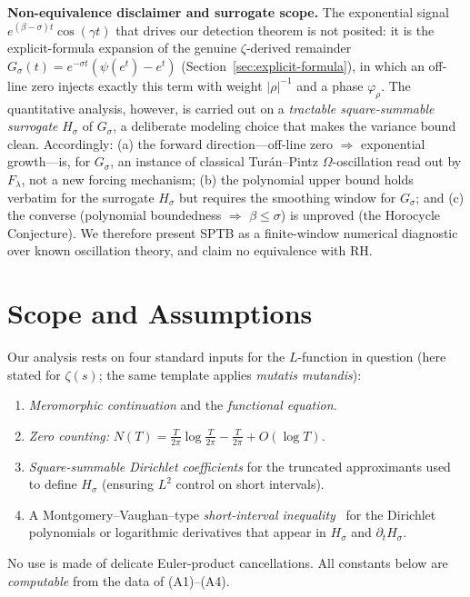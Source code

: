 \medskip
\noindent\textbf{Non-equivalence disclaimer and surrogate scope.}
The exponential signal $e^{(\beta-\sigma)t}\cos(\gamma t)$ that drives our
detection theorem is not posited: it is the explicit-formula expansion of the
genuine $\zeta$-derived remainder $G_\sigma(t)=e^{-\sigma t}(\psi(e^t)-e^t)$
(Section~\ref{sec:explicit-formula}), in which an off-line zero injects exactly
this term with weight $|\rho|^{-1}$ and a phase $\varphi_\rho$. The quantitative
analysis, however, is carried out on a \emph{tractable square-summable surrogate}
$H_\sigma$ of $G_\sigma$, a deliberate modeling choice that makes the variance
bound clean. Accordingly: (a) the forward direction---off-line zero
$\Rightarrow$ exponential growth---is, for $G_\sigma$, an instance of classical
Tur\'an--Pintz $\Omega$-oscillation read out by $F_\lambda$, not a new forcing
mechanism; (b) the polynomial upper bound holds verbatim for the surrogate
$H_\sigma$ but requires the smoothing window for $G_\sigma$; and (c) the
converse (polynomial boundedness $\Rightarrow$ $\beta\le\sigma$) is unproved (the
Horocycle Conjecture). We therefore present SPTB as a finite-window numerical
diagnostic over known oscillation theory, and claim no equivalence with RH.

\section{Scope and Assumptions}

Our analysis rests on four standard inputs for the $L$-function in question
(here stated for $\zeta(s)$; the same template applies \emph{mutatis mutandis}):

\begin{enumerate}
\item[(A1)] \emph{Meromorphic continuation} and the \emph{functional equation.}
\item[(A2)] \emph{Zero counting:}
$N(T)=\tfrac{T}{2\pi}\log\tfrac{T}{2\pi}-\tfrac{T}{2\pi}+O(\log T)$.
\item[(A3)] \emph{Square-summable Dirichlet coefficients} for the truncated
approximants used to define $H_\sigma$ (ensuring $L^2$ control on short intervals).
\item[(A4)] A Montgomery–Vaughan–type \emph{short-interval inequality}~\cite{montgomery-vaughan}
for the Dirichlet
polynomials or logarithmic derivatives that appear in $H_\sigma$ and $\partial_t H_\sigma$.
\end{enumerate}
No use is made of delicate Euler-product cancellations.  All constants below are
\emph{computable} from the data of (A1)–(A4).

